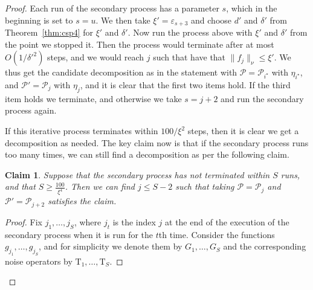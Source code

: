 \documentclass[11pt]{article}
\newtheorem{claim}[thm]{Claim}
\newcommand\norm[1]{\| #1 \|}
\newcommand\eps{\varepsilon}
\renewcommand\geq{\geqslant}
\renewcommand\leq{\leqslant}
\begin{document}
\begin{proof}
    Each run of the secondary process has a parameter $s$, which in the beginning is set to $s=u$. We then take $\xi'=\eps_{s+3}$ and choose $d'$ and $\delta'$ from Theorem~\ref{thm:csp4} for $\xi'$ and $\delta'$. Now run the process above with $\xi'$ and $\delta'$ from the point we stopped it. Then the process would terminate after at most $ O(1/\delta'^2)$ steps, and we would reach $j$ such that have that $\norm{f_j}_{\nu}\leq \xi'$. We thus get the candidate decomposition as in the statement with $\mathcal{P} = \mathcal{P}_{i^{\star}}$ with $\eta_{i^{\star}}$, and  
    $\mathcal{P}' = \mathcal{P}_{j}$ with $\eta_j$, and it is clear that the first two items hold. If the third item holds we terminate, and otherwise we take $s = j+2$ and run the secondary process again.

    If this iterative process terminates within $100/\xi^2$ steps, then it is clear we get a decomposition as needed. The key claim now is that if the secondary process runs too many times, we can still find a decomposition as per the following claim.
    \begin{claim}\label{claim:arithmetic_reg_2nd}
      Suppose that the secondary process has not terminated within $S$ runs, and that $S\geq \frac{100}{\xi^4}$. Then we can find $j\leq S-2$ such that taking $\mathcal{P} = \mathcal{P}_j$ and $\mathcal{P}'=\mathcal{P}_{j+2}$ satisfies the claim.
    \end{claim}
    \begin{proof}
        Fix $j_1,\ldots,j_S$, where $j_t$ is the index $j$ at the end of the execution of the secondary process when it is run for the $t$th time. 
        Consider the functions $ g_{j_1},\ldots,g_{j_S}$, and for simplicity we denote them by $G_1,\ldots,G_{S}$ and the corresponding noise operators by $\mathrm{T}_{1},\ldots,\mathrm{T}_{S}$. 
        

\end{proof}
\end{proof}
\end{document}
